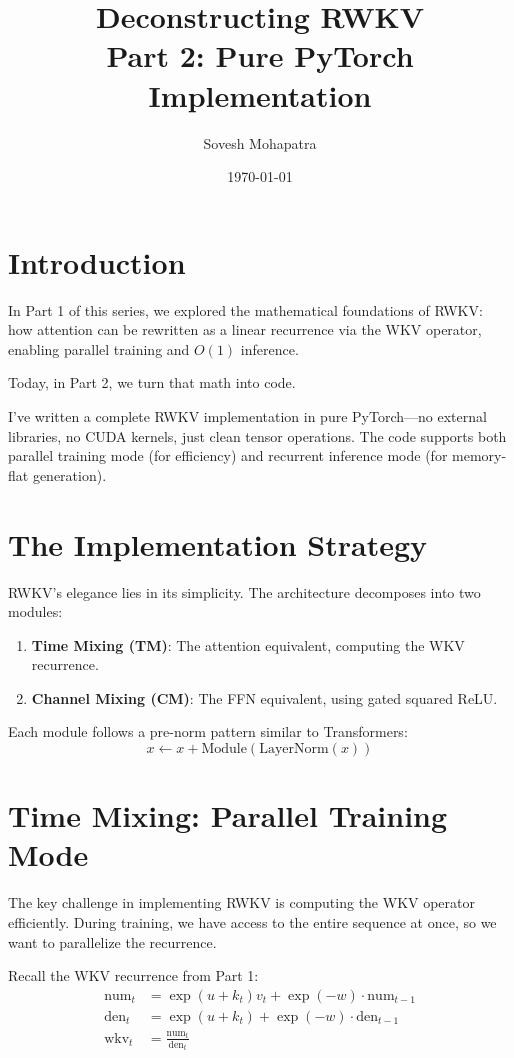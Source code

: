 \documentclass[12pt]{article}
\title{\textbf{Deconstructing RWKV \\ Part 2: Pure PyTorch Implementation}}
\author{Sovesh Mohapatra}
\date{\today}
\begin{document}
\maketitle

\section*{Introduction}
In Part 1 of this series, we explored the mathematical foundations of RWKV: how attention can be rewritten as a linear recurrence via the WKV operator, enabling parallel training and $O(1)$ inference.

Today, in Part 2, we turn that math into code.

I've written a complete RWKV implementation in pure PyTorch—no external libraries, no CUDA kernels, just clean tensor operations. The code supports both parallel training mode (for efficiency) and recurrent inference mode (for memory-flat generation).

\section*{The Implementation Strategy}

RWKV's elegance lies in its simplicity. The architecture decomposes into two modules:

\begin{enumerate}
    \item \textbf{Time Mixing (TM)}: The attention equivalent, computing the WKV recurrence.
    \item \textbf{Channel Mixing (CM)}: The FFN equivalent, using gated squared ReLU.
\end{enumerate}

Each module follows a pre-norm pattern similar to Transformers:
\begin{equation}
    x \leftarrow x + \text{Module}(\text{LayerNorm}(x))
\end{equation}

\section*{Time Mixing: Parallel Training Mode}

The key challenge in implementing RWKV is computing the WKV operator efficiently. During training, we have access to the entire sequence at once, so we want to parallelize the recurrence.

Recall the WKV recurrence from Part 1:
\begin{align}
    \text{num}_t &= \exp(u + k_t) v_t + \exp(-w) \cdot \text{num}_{t-1} \\
    \text{den}_t &= \exp(u + k_t) + \exp(-w) \cdot \text{den}_{t-1} \\
    \text{wkv}_t &= \frac{\text{num}_t}{\text{den}_t}
\end{align}
\end{document}
